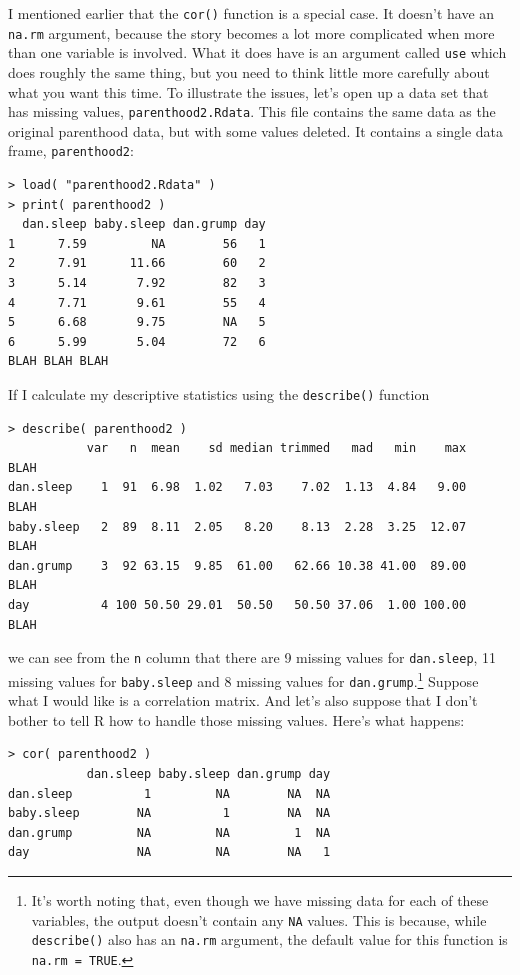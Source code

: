 \documentclass[
]{book}
\begin{document}
I mentioned earlier that the \texttt{cor()} function is a special case. It doesn't have an \texttt{na.rm} argument, because the story becomes a lot more complicated when more than one variable is involved. What it does have is an argument called \texttt{use} which does roughly the same thing, but you need to think little more carefully about what you want this time. To illustrate the issues, let's open up a data set that has missing values, \texttt{parenthood2.Rdata}. This file contains the same data as the original parenthood data, but with some values deleted. It contains a single data frame, \texttt{parenthood2}:

\begin{verbatim}
> load( "parenthood2.Rdata" )
> print( parenthood2 )
  dan.sleep baby.sleep dan.grump day
1      7.59         NA        56   1
2      7.91      11.66        60   2
3      5.14       7.92        82   3
4      7.71       9.61        55   4
5      6.68       9.75        NA   5
6      5.99       5.04        72   6
BLAH BLAH BLAH
\end{verbatim}

If I calculate my descriptive statistics using the \texttt{describe()} function

\begin{verbatim}
> describe( parenthood2 )
           var   n  mean    sd median trimmed   mad   min    max    BLAH
dan.sleep    1  91  6.98  1.02   7.03    7.02  1.13  4.84   9.00    BLAH
baby.sleep   2  89  8.11  2.05   8.20    8.13  2.28  3.25  12.07    BLAH
dan.grump    3  92 63.15  9.85  61.00   62.66 10.38 41.00  89.00    BLAH
day          4 100 50.50 29.01  50.50   50.50 37.06  1.00 100.00    BLAH
\end{verbatim}

we can see from the \texttt{n} column that there are 9 missing values for \texttt{dan.sleep}, 11 missing values for \texttt{baby.sleep} and 8 missing values for \texttt{dan.grump}.\footnote{It's worth noting that, even though we have missing data for each of these variables, the output doesn't contain any \texttt{NA} values. This is because, while \texttt{describe()} also has an \texttt{na.rm} argument, the default value for this function is \texttt{na.rm\ =\ TRUE}.} Suppose what I would like is a correlation matrix. And let's also suppose that I don't bother to tell R how to handle those missing values. Here's what happens:

\begin{verbatim}
> cor( parenthood2 )
           dan.sleep baby.sleep dan.grump day
dan.sleep          1         NA        NA  NA
baby.sleep        NA          1        NA  NA
dan.grump         NA         NA         1  NA
day               NA         NA        NA   1
\end{verbatim}
\end{document}
